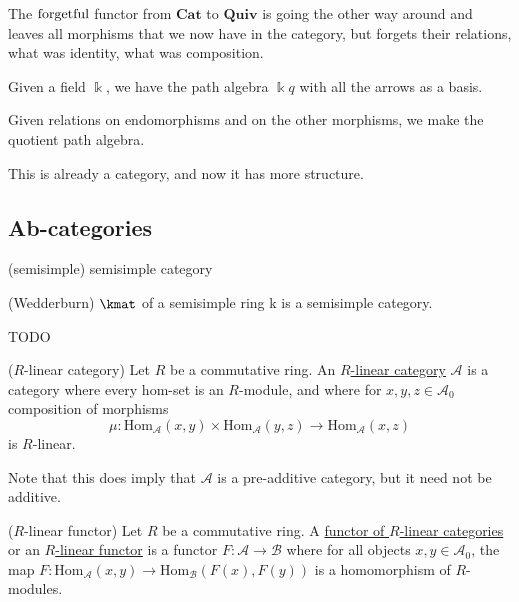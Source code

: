 The $\textup{forgetful}$ functor from $\mathbf{Cat}$ to $\mathbf{Quiv}$ is going the other way around and leaves all
morphisms that we now have in the category, but forgets their relations, what was identity, what was composition.

Given a field $\Bbbk$, we have the path algebra $\Bbbk q$ with all the arrows as a basis.

Given relations on endomorphisms and on the other morphisms, we make the quotient path algebra.

This is already a category, and now it has more structure.

\subsection{Ab-categories}


\begin{definition}{(semisimple)}
semisimple category
\end{definition}

\begin{theorem}{(Wedderburn)}
$\kmat$ of a semisimple ring k is a semisimple category.
\end{theorem}
TODO








\begin{definition}{($R$-linear category)}
Let $R$ be a commutative ring. An \ul{$R$-linear category} $\mathcal{A}$ is a category where every hom-set is an
$R$-module, and where for $x,y,z \in \mathcal{A}_{0}$ composition of morphisms
\[
\mu : \mathrm{Hom}_{\mathcal{A}}(x,y) \times \mathrm{Hom}_{\mathcal{A}}(y,z) \rightarrow \mathrm{Hom}_{\mathcal{A}}(x,z)
\]
is $R$-linear.

Note that this does imply that $\mathcal{A}$ is a pre-additive category, but it need not be additive.
\end{definition}

\begin{definition}{($R$-linear functor)}
Let $R$ be a commutative ring. A \ul{functor of $R$-linear categories} or an \ul{$R$-linear functor} is a functor
$F : \mathcal{A} \rightarrow \mathcal{B} $ where for all objects $x, y \in \mathcal{A}_{0}$, the map
$F : \mathrm{Hom}_{\mathcal{A}}(x,y) \rightarrow \mathrm{Hom}_{\mathcal{B}}(F(x), F(y))$ is a homomorphism
of $R$-modules.
\end{definition}


